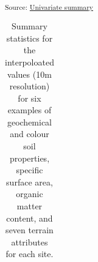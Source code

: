 \documentclass[
  number]{elsarticle}
\begin{document}
\textsubscript{Source:
\href{https://alex-koiter.github.io/spatial-variability-soil-manuscript/notebooks/univariate_summary.qmd.html\#cell-tbl-univariate-summary}{Univariate
summary}}

\begin{longtable}[]{@{}
  >{\centering\arraybackslash}p{}
  >{\centering\arraybackslash}p{}
  >{\centering\arraybackslash}p{}
  >{\centering\arraybackslash}p{}
  >{\centering\arraybackslash}p{}
  >{\centering\arraybackslash}p{}
  >{\centering\arraybackslash}p{}@{}}

\caption{\label{tbl-univariate2-summary}Summary statistics for the
interpoloated values (10m resolution) for six examples of geochemical
and colour soil properties, specific surface area, organic matter
content, and seven terrain attributes for each site.}

\tabularnewline


\end{longtable}
\end{document}
